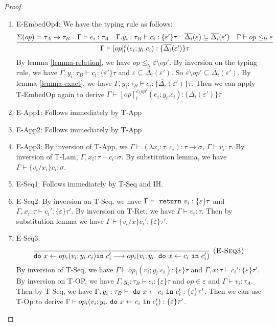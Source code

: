 \begin{proof}
\begin{enumerate}
\item E-EmbedOp4:
We have the typing rule as follows:
$$\infer
  {\Gamma\vdash [op]^\varepsilon_l(e_i; y_i.c_i) : \{\overline{\Delta_i}(\varepsilon')\}\tau }
  {\Sigma(op) = \tau_A \rightarrow \tau_B & \Gamma \vdash e_i : \tau_A & \Gamma. y_i:\tau_B\vdash c_i: \{\varepsilon'\}\tau & \overline{\Delta_i}(\varepsilon) \subseteq \overline{\Delta_i}(\varepsilon') & \Gamma \vdash op \leq_{li} \varepsilon}  $$
By lemma \ref{lemma-relation}, we have $op \leq_{li} \varepsilon \setminus op'$. By inversion on the typing rule, we have $\Gamma, y_i:\tau_B \vdash c_i:\{\varepsilon'\}\tau$ and $\varepsilon \subseteq \overline{\Delta_i}(\varepsilon')$.  So $\varepsilon \setminus op' \subseteq \overline{\Delta_i}(\varepsilon')$. By lemma \ref{lemma-exact}, we have $\Gamma, y_i:\tau_B \vdash c_i:\{\overline{\Delta_i}(\varepsilon')\}\tau$. Then we can apply T-EmbedOp again to derive $\Gamma\vdash [op]^{\varepsilon \setminus op'}_l(e_i; y_i.c_i) : \{\overline{\Delta_i}(\varepsilon')\}\tau $
  
\item E-App1: Follows immediately by T-App
\item E-App2: Follows immediately by T-App
\item E-App3: By inversion of T-App, we $\Gamma \vdash (\lambda x_i: \tau.\ c_i) : \tau \rightarrow \sigma$, $\Gamma \vdash v_i : \tau$. By inversion of T-Lam, $\Gamma, x_i:\tau \vdash c_i : \sigma$. By substitution lemma, we have $\Gamma \vdash \{v_i/x_i\}c_i : \sigma$.

\item E-Seq1:  Follows immediately by T-Seq and IH.
\item E-Seq2: By inversion on T-Seq, we have $\Gamma \vdash \ \texttt{return}\  v_i : \{\varepsilon\}\tau$ and $\Gamma, x_i:  \tau \vdash c_i': \{\varepsilon\}\tau'$. By inversion on T-Ret, we have $\Gamma \vdash v_i: \tau$. Then by substitution lemma we have $\Gamma \vdash \{v_i/x\}c_i' : \{\varepsilon\}\tau'$.
\item E-Seq3: 
$$
\infer[\textsc{(E-Seq3)}]
  {\texttt{do}\ x \leftarrow op_i(v_i; y_i.c_i) \texttt{in}\ c_i' \longrightarrow op_i(v_i; y_i. \m{do} x \leftarrow c_i \m{in} c_i')}
  {} $$
  By inversion of T-Seq, we have $\Gamma \vdash op_i(v_i; y_i.c_i) : \{\varepsilon\}\tau$  and $\Gamma , x:\tau \vdash c_i' : \{\varepsilon\}\tau'$. By inversion on T-OP, we have $\Gamma, y_i: \tau_B \vdash c_i: \{\varepsilon\}\tau$ and $op \in \varepsilon$ and $\Gamma \vdash v_i : \tau_A$.  Then by T-Seq, we have $\Gamma, y_i : \tau_B \vdash \ \texttt{do}\  x \leftarrow c_i \ \texttt{in}\  c_i' : \{\varepsilon\}\tau'$. Then we can use T-Op to derive $\Gamma \vdash op_i(v_i; y_i. \ \texttt{do}\  x \leftarrow c_i \ \texttt{in}\  c_i') : \{\varepsilon\}\tau'$.


\end{enumerate}
\end{proof}
